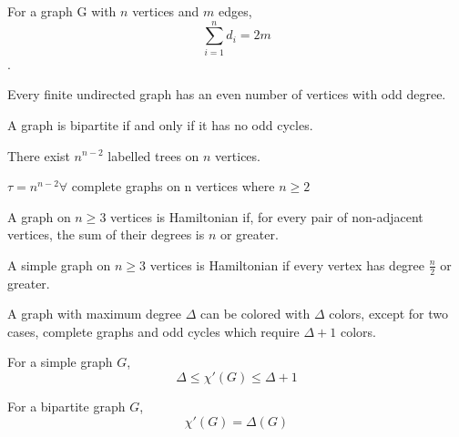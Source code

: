 
\begin{theorem}
    For a graph G with $n$ vertices and $m$ edges, 
    \[\sum_{i=1}^n d_i=2m\].
\end{theorem}

\begin{theorem}
    Every finite undirected graph has an even number of vertices with odd degree.
\end{theorem}

\begin{theorem}
    A graph is bipartite if and only if it has no odd cycles.
\end{theorem}

\begin{theorem}
    There exist $n^{n-2}$ labelled trees on $n$ vertices.

    $\tau = n^{n-2} \forall$ complete graphs on n vertices where $ n\geq 2$
\end{theorem}

\begin{theorem}
    A graph on $n\geq3$ vertices is Hamiltonian if, for every pair of non-adjacent vertices, the sum of their degrees is $n$ or greater.
\end{theorem}

\begin{theorem}
    A simple graph on $n\geq3$ vertices is Hamiltonian if every vertex has degree $\frac{n}{2}$ or greater.
\end{theorem}





\begin{theorem}
    A graph with maximum degree $\Delta$ can be colored with $\Delta$ colors, except for two cases, complete graphs and odd cycles which require $\Delta + 1$ colors.
\end{theorem}

\begin{theorem}
    For a simple graph $G$, \[\Delta \leq \chi'(G) \leq \Delta + 1\]
\end{theorem}

\begin{theorem}
    For a bipartite graph $G$, \[\chi'(G)=\Delta(G)\]
\end{theorem}

